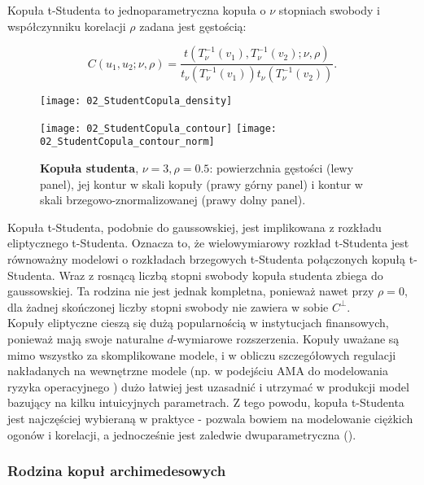 \begin{df}
	Kopuła t-Studenta to jednoparametryczna kopuła o $\nu$ stopniach swobody i współczynniku korelacji $\rho$ zadana jest gęstością:
	
	$$ C(u_1, u_2;\nu,\rho) = \frac{t(T_{\nu}^{-1}(v_1), T_{\nu}^{-1}(v_2);\nu,\rho)}{t_{\nu}(T_{\nu}^{-1}(v_1))t_{\nu}(T_{\nu}^{-1}(v_2))}.$$
\end{df}
\begin{figure}[h]
	\centering
	\begin{minipage}{0.5\linewidth}
		\texttt{[image: 02\_StudentCopula\_density]}
	\end{minipage}
	\begin{minipage}{0.45\linewidth}
		\texttt{[image: 02\_StudentCopula\_contour]}
		\texttt{[image: 02\_StudentCopula\_contour\_norm]}
	\end{minipage}
	\caption{\textbf{Kopuła studenta}, $\nu=3, \rho=0.5$: powierzchnia gęstości (lewy panel), jej kontur w skali kopuły (prawy górny panel) i kontur w skali brzegowo-znormalizowanej (prawy dolny panel). \label{fig:student_copula_density}}
\end{figure}
Kopuła t-Studenta, podobnie do gaussowskiej, jest implikowana z rozkładu eliptycznego t-Studenta. Oznacza to, że wielowymiarowy rozkład t-Studenta jest równoważny modelowi o rozkładach brzegowych t-Studenta połączonych kopułą t-Studenta. Wraz z rosnącą liczbą stopni swobody kopuła studenta zbiega do gaussowskiej. Ta rodzina nie jest jednak kompletna, ponieważ nawet przy $\rho=0$, dla żadnej skończonej liczby stopni swobody nie zawiera w sobie $C^{\perp}$.\\

Kopuły eliptyczne cieszą się dużą popularnością w instytucjach finansowych, ponieważ mają swoje naturalne $d$-wymiarowe rozszerzenia. Kopuły uważane są mimo wszystko za skomplikowane modele, i w obliczu szczegółowych regulacji nakładanych na wewnętrzne modele (np. w podejściu AMA do modelowania ryzyka operacyjnego \cite{BaselII}) dużo łatwiej jest uzasadnić i utrzymać w produkcji model bazujący na kilku intuicyjnych parametrach. Z tego powodu, kopuła t-Studenta jest najczęściej wybieraną w praktyce - pozwala bowiem na modelowanie ciężkich ogonów i korelacji, a jednocześnie jest zaledwie dwuparametryczna (\cite{OpRisk}).\\

\subsubsection{Rodzina kopuł archimedesowych}

